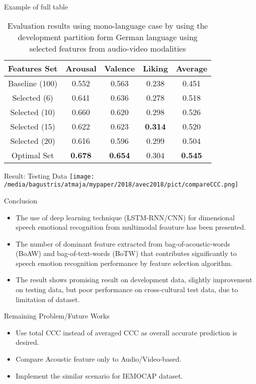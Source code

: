 \documentclass{beamer}
\begin{document}
\begin{frame}[t, fragile]{Example of full table}
\begin{table}[ht]
\centering
\caption{Evaluation results using mono-language case by using the development partition form German language using selected features from audio-video modalities }
\begin{tabular}{c c c c c}
\hline
Features Set	&	Arousal	&	Valence	&	Liking	&	Average \\
\hline
Baseline (100) 	&	0.552	&	0.563	&	0.238	&	0.451 \\
Selected (6)	&	0.641	&	0.636	&	0.278	&	0.518 \\
Selected (10)	&	0.660	&	0.620	&	0.298	&	0.526 \\
Selected (15)	&	0.622	&	0.623	&	\textbf{0.314}	&	0.520 \\
Selected (20)	&	0.616	&	0.596	&	0.299	&	0.504 \\
Optimal Set	&		\textbf{0.678}	&		\textbf{0.654}	&	0.304	&	\textbf{0.545} \\
\hline
\end{tabular}
\label{tab:DevelDE}
\end{table}
\end{frame}

\begin{frame}[t, fragile]{Result: Testing Data}
\texttt{[image: /media/bagustris/atmaja/mypaper/2018/avec2018/pict/compareCCC.png]}
\end{frame}

\begin{frame}[t, fragile]{Conclusion}
\begin{itemize}
	\item The use of deep learning technique (LSTM-RNN/CNN) for dimensional 
	      speech emotional recognition from multimodal feauture has been presented.
	\item The number of dominant feature extracted from bag-of-acoustic-words
	      (BoAW) and bag-of-text-words (BoTW) that contributes significantly to 
	      speech emotion recognition
	      performance by feature selection algorithm.
	\item The result shows promising result on development data, slightly improvement on 
	      testing data, but poor performance on cross-cultural test data, due to 
	      limitation of dataset.
\end{itemize}
\end{frame}



\begin{frame}[t, fragile]{Remaining Problem/Future Works}
\begin{itemize}
\item Use total CCC instead of averaged CCC as overall accurate prediction is desired.
\item Compare Acoustic feature only to Audio/Video-based.
\item Implement the similar scenario for IEMOCAP dataset.
\end{itemize}
\end{frame}
\end{document}
